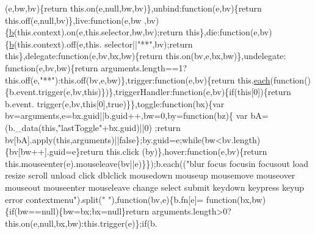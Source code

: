 \begin{DoxyCode}
      (e,bw,bv)\{\textcolor{keywordflow}{return} this.on(e,null,bw,bv)\},unbind:\textcolor{keyword}{function}(e,bv)\{\textcolor{keywordflow}{return} this.off(e,null,bv)\},live:\textcolor{keyword}{function}(e,bw
      ,bv)\{\hyperlink{jquery_8js_aa4026ad5544b958e54ce5e106fa1c805}{b}(this.context).on(e,this.selector,bw,bv);\textcolor{keywordflow}{return} \textcolor{keyword}{this}\},die:\textcolor{keyword}{function}(e,bv)\{\hyperlink{jquery_8js_aa4026ad5544b958e54ce5e106fa1c805}{b}(this.context).off(e,this.
      selector||\textcolor{stringliteral}{"**"},bv);\textcolor{keywordflow}{return} \textcolor{keyword}{this}\},delegate:\textcolor{keyword}{function}(e,bv,bx,bw)\{\textcolor{keywordflow}{return} this.on(bv,e,bx,bw)\},undelegate:\textcolor{keyword}{
      function}(e,bv,bw)\{\textcolor{keywordflow}{return} arguments.length==1?this.off(e,\textcolor{stringliteral}{"**"}):this.off(bv,e,bw)\},trigger:\textcolor{keyword}{function}(e,bv)\{\textcolor{keywordflow}{return} 
      this.\hyperlink{jquery_8js_a871ff39db627c54c710a3e9909b8234c}{each}(\textcolor{keyword}{function}()\{b.event.trigger(e,bv,\textcolor{keyword}{this})\})\},triggerHandler:\textcolor{keyword}{function}(e,bv)\{\textcolor{keywordflow}{if}(\textcolor{keyword}{this}[0])\{\textcolor{keywordflow}{return} b.event.
      trigger(e,bv,\textcolor{keyword}{this}[0],\textcolor{keyword}{true})\}\},toggle:\textcolor{keyword}{function}(bx)\{var bv=arguments,e=bx.guid||b.guid++,bw=0,by=\textcolor{keyword}{function}(bz)\{
      var bA=(b.\_data(\textcolor{keyword}{this},\textcolor{stringliteral}{"lastToggle"}+bx.guid)||0)%
      ;\textcolor{keywordflow}{return} bv[bA].apply(\textcolor{keyword}{this},arguments)||\textcolor{keyword}{false}\};by.guid=e;\textcolor{keywordflow}{while}(bw<bv.length)\{bv[bw++].guid=e\}\textcolor{keywordflow}{return} this.click
      (by)\},hover:\textcolor{keyword}{function}(e,bv)\{\textcolor{keywordflow}{return} this.mouseenter(e).mouseleave(bv||e)\}\});b.each((\textcolor{stringliteral}{"blur focus focusin
       focusout load resize scroll unload click dblclick mousedown mouseup mousemove mouseover mouseout mouseenter
       mouseleave change select submit keydown keypress keyup error contextmenu"}).split(\textcolor{stringliteral}{" "}),\textcolor{keyword}{function}(bv,e)\{b.fn[e]=\textcolor{keyword}{
      function}(bx,bw)\{\textcolor{keywordflow}{if}(bw==null)\{bw=bx;bx=null\}\textcolor{keywordflow}{return} arguments.length>0?this.on(e,null,bx,bw):this.trigger(e)\};\textcolor{keywordflow}{if}(b.

\end{DoxyCode}
